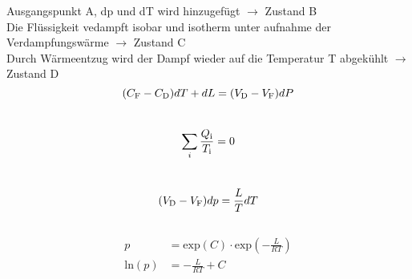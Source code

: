 Ausgangspunkt A, dp und dT wird hinzugefügt $\rightarrow$ Zustand B\\
Die Flüssigkeit vedampft isobar und isotherm unter aufnahme der Verdampfungswärme $\rightarrow$ Zustand C\\
Durch Wärmeentzug wird der Dampf wieder auf die Temperatur T abgekühlt $\rightarrow$ Zustand D\\


\begin{equation}
    (C_\text{F}-C_\text{D})dT + dL = (V_\text{D}-V_\text{F})dP\\
    \label{eqn:long}
\end{equation}
\\
\begin{equation}
    \sum_{i}\frac{Q_\text{i}}{T_\text{i}}=0\\
    \label{eqn:sum}
\end{equation}
\\
\begin{equation}
    (V_\text{D}-V_\text{F})dp =\frac{L}{T}dT\\
    \label{eqn:sum}
\end{equation}
\\
\begin{align}
p &= \text{exp}(C)\cdot \text{exp}\left(-\frac{L}{RT}\right)\\
\text{ln}(p)&= -\frac{L}{RT} + C
\end{align}

